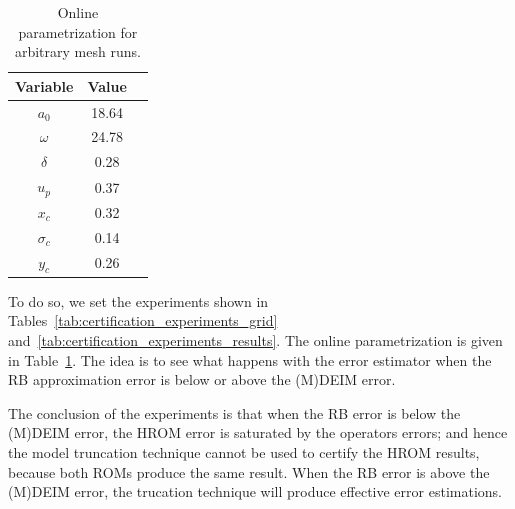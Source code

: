 \documentclass[../../thesis.tex]{subfiles}
\begin{document}
\begin{table}[h]
    \centering
    \caption{Online parametrization for arbitrary mesh runs.}
    \begin{tabular}{ccc}
    \toprule
        Variable   & Value  \\ 
        \midrule
        $a_0$      & 18.64   \\
        $\omega$   & 24.78   \\
        $\delta$   & 0.28    \\
        $u_p$      & 0.37    \\
        \midrule
        $x_c$      & 0.32    \\
        $\sigma_c$ & 0.14    \\
        $y_c$      & 0.26    \\ 
        \bottomrule
    \end{tabular}
    \label{tab:parameters_online_arbitrary}
\end{table}
To do so, we set the experiments shown in 
Tables~\ref{tab:certification_experiments_grid} 
and~\ref{tab:certification_experiments_results}.
The online parametrization is given in Table~\ref{tab:parameters_online_arbitrary}.
The idea is to see what happens with the error estimator when 
the RB approximation error is below or above the (M)DEIM error.

The conclusion of the experiments is that when the RB error is below the (M)DEIM error,
the HROM error is saturated by the operators errors;
and hence the model truncation technique cannot be used to certify the HROM results,
because both ROMs produce the same result.
When the RB error is above the (M)DEIM error, the trucation technique 
will produce effective error estimations.
\end{document}
